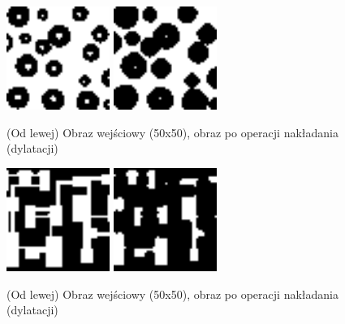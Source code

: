 \documentclass[final,a4paper,openany,12pt]{mwbk}
\begin{document}
\begin{figure}[H]
	\begin{center}
		\includegraphics[width=0.3\textwidth]{1/1Bin_D_Original}
		\includegraphics[width=0.3\textwidth]{1/1Bin_D_Result}
	\end{center}
	\caption{(Od lewej) Obraz wejściowy (50x50), obraz po operacji nakładania (dylatacji) }
\end{figure}

\begin{figure}[H]
	\begin{center}
		\includegraphics[width=0.3\textwidth]{2/2Bin_D_Original}
		\includegraphics[width=0.3\textwidth]{2/2Bin_D_Result}
	\end{center}
	\caption{(Od lewej) Obraz wejściowy (50x50), obraz po operacji nakładania (dylatacji)}
\end{figure}
\end{document}
